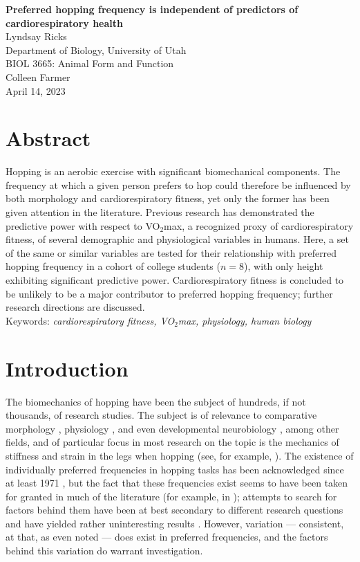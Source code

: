 \documentclass{article}
\begin{document}
\begin{titlepage}
	\centering
	\vspace*{0.2\textheight}
	\textbf{Preferred hopping frequency is independent of predictors of cardiorespiratory health}\\
	Lyndsay Ricks\\
	Department of Biology, University of Utah\\
	BIOL 3665: Animal Form and Function\\
	Colleen Farmer\\
	April 14, 2023
\end{titlepage}
\section{Abstract}

{\parindent0pt Hopping is an aerobic exercise with significant biomechanical components. The frequency at which a given person prefers to hop could therefore be influenced by both morphology and cardiorespiratory fitness, yet only the former has been given attention in the literature. Previous research has demonstrated the predictive power with respect to VO$_2$max, a recognized proxy of cardiorespiratory fitness, of several demographic and physiological variables in humans. Here, a set of the same or similar variables are tested for their relationship with preferred hopping frequency in a cohort of college students ($n = 8$), with only height exhibiting significant predictive power. Cardiorespiratory fitness is concluded to be unlikely to be a major contributor to preferred hopping frequency; further research directions are discussed.} \\

{\parindent0pt Keywords: \emph{cardiorespiratory fitness, VO$_2$max, physiology, human biology}}

\pagebreak

\section{Introduction}
The biomechanics of hopping have been the subject of hundreds, if not thousands, of research studies. The subject is of relevance to comparative morphology \parencite{farley1993, lee2014}, physiology \parencite{ferris1997}, and even developmental neurobiology \parencite{beerse2020}, among other fields, and of particular focus in most research on the topic is the mechanics of stiffness and strain in the legs when hopping (see, for example, \cite{ferris1997,mcmahon1990,moholkar2004}). The existence of individually preferred frequencies in hopping tasks has been acknowledged since at least 1971 \parencite{jones1971}, but the fact that these frequencies exist seems to have been taken for granted in much of the literature (for example, in \cite{farley1991}); attempts to search for factors behind them have been at best secondary to different research questions and have yielded rather uninteresting results \parencite{demirbuken2009,granata2002}. However, variation --- consistent, at that, as even \textcite{jones1971} noted --- does exist in preferred frequencies, and the factors behind this variation do warrant investigation.
\end{document}
